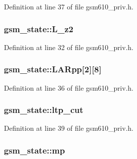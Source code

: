 Definition at line 37 of file gsm610\+\_\+priv.\+h.

\subsubsection[{\texorpdfstring{L\+\_\+z2}{L_z2}}]{ gsm\+\_\+state\+::\+L\+\_\+z2}\hypertarget{structgsm__state_a8c0db6b1ec993de5385c90843b921eee}{}\label{structgsm__state_a8c0db6b1ec993de5385c90843b921eee}


Definition at line 32 of file gsm610\+\_\+priv.\+h.

\subsubsection[{\texorpdfstring{L\+A\+Rpp}{LARpp}}]{ gsm\+\_\+state\+::\+L\+A\+Rpp\mbox{[}2\mbox{]}\mbox{[}8\mbox{]}}\hypertarget{structgsm__state_a115c4dbf9aa013debd32634e3320a06f}{}\label{structgsm__state_a115c4dbf9aa013debd32634e3320a06f}


Definition at line 36 of file gsm610\+\_\+priv.\+h.

\subsubsection[{\texorpdfstring{ltp\+\_\+cut}{ltp_cut}}]{ gsm\+\_\+state\+::ltp\+\_\+cut}\hypertarget{structgsm__state_a49af42d73207ea1dfe1dc9fb117e60d1}{}\label{structgsm__state_a49af42d73207ea1dfe1dc9fb117e60d1}


Definition at line 39 of file gsm610\+\_\+priv.\+h.

\subsubsection[{\texorpdfstring{mp}{mp}}]{ gsm\+\_\+state\+::mp}\hypertarget{structgsm__state_a564b1f8742453a87c8cfb0cad7b8f213}{}\label{structgsm__state_a564b1f8742453a87c8cfb0cad7b8f213}


